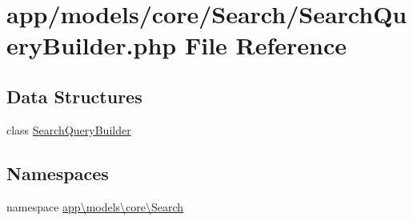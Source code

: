 \hypertarget{_search_query_builder_8php}{\section{app/models/core/\-Search/\-Search\-Query\-Builder.php File Reference}
\label{_search_query_builder_8php}
}
\subsection*{Data Structures}
\begin{DoxyCompactItemize}
\item 
class \hyperlink{classapp_1_1models_1_1core_1_1_search_1_1_search_query_builder}{Search\-Query\-Builder}
\end{DoxyCompactItemize}
\subsection*{Namespaces}
\begin{DoxyCompactItemize}
\item 
namespace \hyperlink{namespaceapp_1_1models_1_1core_1_1_search}{app\textbackslash{}models\textbackslash{}core\textbackslash{}\-Search}
\end{DoxyCompactItemize}
